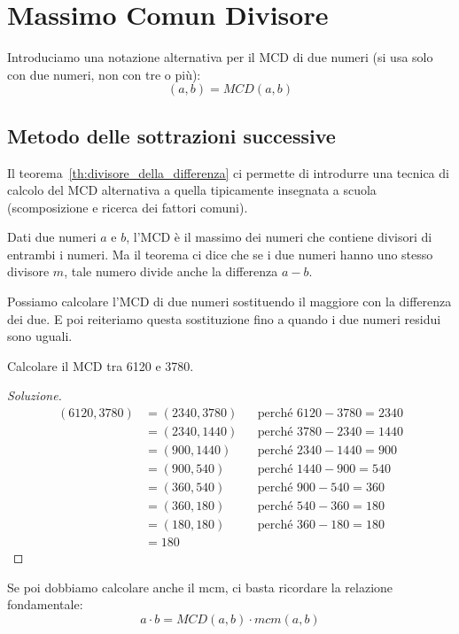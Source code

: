 \chapter{Massimo Comun Divisore}

Introduciamo una notazione alternativa per il MCD di due numeri (si usa solo con due numeri, non con tre o più):
\begin{equation*}
    (a, b) = MCD(a, b)
\end{equation*}

\section{Metodo delle sottrazioni successive}

Il teorema~\ref{th:divisore_della_differenza} ci permette di introdurre una tecnica di calcolo del MCD alternativa a quella tipicamente insegnata a scuola (scomposizione e ricerca dei fattori comuni).

Dati due numeri $a$ e $b$, l'MCD è il massimo dei numeri che contiene divisori di entrambi i numeri. Ma il teorema ci dice che se i due numeri hanno uno stesso divisore $m$, tale numero divide anche la differenza $a - b$.

\begin{mdframed}
\begin{definizione}

Possiamo calcolare l'MCD di due numeri sostituendo il maggiore con la differenza dei due. E poi reiteriamo questa sostituzione fino a quando i due numeri residui sono uguali.

\end{definizione}
\end{mdframed}

\begin{mdframed}
    \begin{esercizio}
        Calcolare il MCD tra 6120 e 3780.
    \end{esercizio}
    \begin{proof}[Soluzione]
        \begin{align*}
            (6120, 3780) &= (2340, 3780) &&\text{perché } 6120 - 3780 = 2340 \\
            &= (2340, 1440) &&\text{perché } 3780 - 2340 = 1440 \\
            &= (900, 1440) &&\text{perché } 2340 - 1440 = 900 \\
            &= (900, 540) &&\text{perché } 1440 - 900 = 540 \\
            &= (360, 540) &&\text{perché } 900 - 540 = 360 \\
            &= (360, 180) &&\text{perché } 540 - 360 = 180 \\
            &= (180, 180) &&\text{perché } 360 - 180 = 180 \\
            &= 180
        \end{align*}
    \end{proof}
\end{mdframed}

Se poi dobbiamo calcolare anche il mcm, ci basta ricordare la relazione fondamentale:
\begin{equation}
    a \cdot b = MCD(a, b) \cdot mcm(a, b)
\end{equation}

